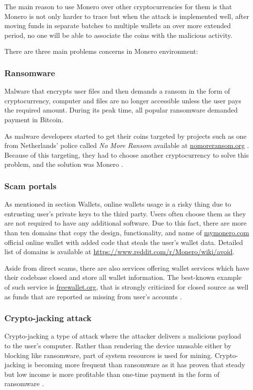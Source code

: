\documentclass[
  printed, %
  table,   %
  lof,     %
  lot,     %
           oneside, color
]{fithesis3}
\begin{document}
The main reason to use Monero over other cryptocurrencies for them is that Monero is not only harder to trace but when the attack is implemented well, after moving funds in separate batches to multiple wallets an over more extended period, no one will be able to associate the coins with the malicious activity.

There are three main problems concerns in Monero environment:
\subsubsection{Ransomware} 
\label{cha:ransomware}
Malware that encrypts user files and then demands a ransom in the form of cryptocurrency, computer and files are no longer accessible unless the user pays the required amount. During its peak time, all popular ransomware demanded payment in Bitcoin. 

As malware developers started to get their coins targeted by projects such as one from Netherlands' police called \textit{No More Ransom} available at \url{nomoreransom.org} \cite{martin2017don,paquet2018ransomware}. 
Because of this targeting, they had to choose another cryptocurrency to solve this problem, and the solution was Monero \cite{cusack2018points}.

\subsubsection{Scam portals}
\label{cha:scamportals}
As mentioned in section Wallets, online wallets usage is a risky thing due to entrusting user's private keys to the third party. Users often choose them as they are not required to have any additional software. Due to this fact, there are more than ten domains that copy the design, functionality, and name of \url{mymonero.com} official online wallet with added code that steals the user's wallet data. Detailed list of domains is available at \url{https://www.reddit.com/r/Monero/wiki/avoid}.

Aside from direct scams, there are also services offering wallet services which have their codebase closed and store all wallet information. The best-known example of such service is \url{freewallet.org}, that is strongly criticized for closed source as well as funds that are reported as missing from user's accounts \cite{wijayamonero}.
\subsubsection{Crypto-jacking attack}
\label{cha:cryptojacking} 
Crypto-jacking a type of attack where the attacker delivers a malicious payload to the user's computer. Rather than rendering the device unusable either by blocking like ransomware, part of system resources is used for mining.
Crypto-jacking is becoming more frequent than ransomware as it has proven that steady but low income is more profitable than one-time payment in the form of ransomware \cite{higbee2018role}.
\vspace{-1em}
\end{document}
